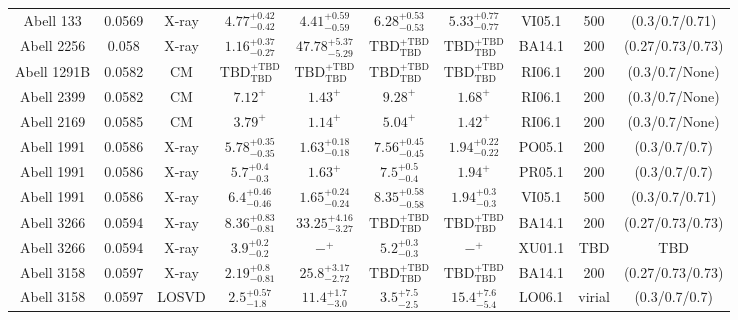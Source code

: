 \begin{table}
\begin{tabular}{cccccccccc}
Abell 133 & 0.0569 & X-ray & ${4.77}^{+0.42}_{-0.42}$ & ${4.41}^{+0.59}_{-0.59}$ & ${6.28}^{+0.53}_{-0.53}$ & ${5.33}^{+0.77}_{-0.77}$ & VI05.1 & 500 & (0.3/0.7/0.71) \\
Abell 2256 & 0.058 & X-ray & ${1.16}^{+0.37}_{-0.27}$ & ${47.78}^{+5.37}_{-5.29}$ & ${\mathrm{TBD}}^{+\mathrm{TBD}}_{\mathrm{TBD}}$ & ${\mathrm{TBD}}^{+\mathrm{TBD}}_{\mathrm{TBD}}$ & BA14.1 & 200 & (0.27/0.73/0.73) \\
Abell 1291B & 0.0582 & CM & ${\mathrm{TBD}}^{+\mathrm{TBD}}_{\mathrm{TBD}}$ & ${\mathrm{TBD}}^{+\mathrm{TBD}}_{\mathrm{TBD}}$ & ${\mathrm{TBD}}^{+\mathrm{TBD}}_{\mathrm{TBD}}$ & ${\mathrm{TBD}}^{+\mathrm{TBD}}_{\mathrm{TBD}}$ & RI06.1 & 200 & (0.3/0.7/None) \\
Abell 2399 & 0.0582 & CM & ${7.12}^{+}_{}$ & ${1.43}^{+}_{}$ & ${9.28}^{+}_{}$ & ${1.68}^{+}_{}$ & RI06.1 & 200 & (0.3/0.7/None) \\
Abell 2169 & 0.0585 & CM & ${3.79}^{+}_{}$ & ${1.14}^{+}_{}$ & ${5.04}^{+}_{}$ & ${1.42}^{+}_{}$ & RI06.1 & 200 & (0.3/0.7/None) \\
Abell 1991 & 0.0586 & X-ray & ${5.78}^{+0.35}_{-0.35}$ & ${1.63}^{+0.18}_{-0.18}$ & ${7.56}^{+0.45}_{-0.45}$ & ${1.94}^{+0.22}_{-0.22}$ & PO05.1 & 200 & (0.3/0.7/0.7) \\
Abell 1991 & 0.0586 & X-ray & ${5.7}^{+0.4}_{-0.3}$ & ${1.63}^{+}_{}$ & ${7.5}^{+0.5}_{-0.4}$ & ${1.94}^{+}_{}$ & PR05.1 & 200 & (0.3/0.7/0.7) \\
Abell 1991 & 0.0586 & X-ray & ${6.4}^{+0.46}_{-0.46}$ & ${1.65}^{+0.24}_{-0.24}$ & ${8.35}^{+0.58}_{-0.58}$ & ${1.94}^{+0.3}_{-0.3}$ & VI05.1 & 500 & (0.3/0.7/0.71) \\
Abell 3266 & 0.0594 & X-ray & ${8.36}^{+0.83}_{-0.81}$ & ${33.25}^{+4.16}_{-3.27}$ & ${\mathrm{TBD}}^{+\mathrm{TBD}}_{\mathrm{TBD}}$ & ${\mathrm{TBD}}^{+\mathrm{TBD}}_{\mathrm{TBD}}$ & BA14.1 & 200 & (0.27/0.73/0.73) \\
Abell 3266 & 0.0594 & X-ray & ${3.9}^{+0.2}_{-0.2}$ & ${-}^{+}_{}$ & ${5.2}^{+0.3}_{-0.3}$ & ${-}^{+}_{}$ & XU01.1 & TBD & TBD \\
Abell 3158 & 0.0597 & X-ray & ${2.19}^{+0.8}_{-0.81}$ & ${25.8}^{+3.17}_{-2.72}$ & ${\mathrm{TBD}}^{+\mathrm{TBD}}_{\mathrm{TBD}}$ & ${\mathrm{TBD}}^{+\mathrm{TBD}}_{\mathrm{TBD}}$ & BA14.1 & 200 & (0.27/0.73/0.73) \\
Abell 3158 & 0.0597 & LOSVD & ${2.5}^{+0.57}_{-1.8}$ & ${11.4}^{+1.7}_{-3.0}$ & ${3.5}^{+7.5}_{-2.5}$ & ${15.4}^{+7.6}_{-5.4}$ & LO06.1 & virial & (0.3/0.7/0.7) \\

\end{tabular}
\end{table}
